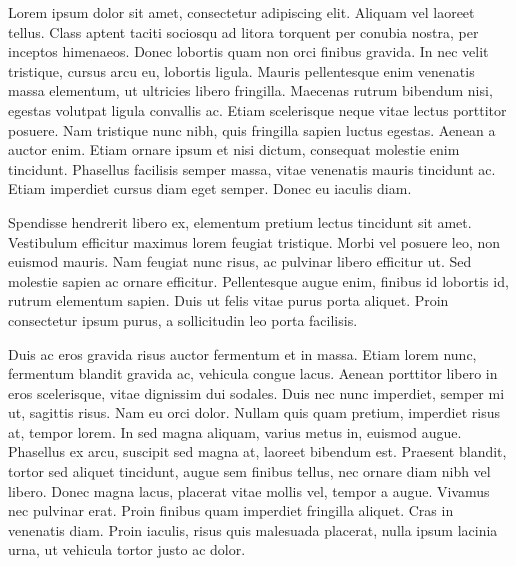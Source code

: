 \documentclass[]{ICCQS}%
\begin{document}
\begin{fmtext}
Lorem ipsum dolor sit amet, consectetur adipiscing elit. Aliquam vel laoreet tellus. Class aptent taciti sociosqu ad litora torquent per conubia nostra, per inceptos himenaeos. Donec lobortis quam non orci finibus gravida. In nec velit tristique, cursus arcu eu, lobortis ligula. Mauris pellentesque enim venenatis massa elementum, ut ultricies libero fringilla. Maecenas rutrum bibendum nisi, egestas volutpat ligula convallis ac. Etiam scelerisque neque vitae lectus porttitor posuere. Nam tristique nunc nibh, quis fringilla sapien luctus egestas. Aenean a auctor enim. Etiam ornare ipsum et nisi dictum, consequat molestie enim tincidunt. Phasellus facilisis semper massa, vitae venenatis mauris tincidunt ac. Etiam imperdiet cursus diam eget semper. Donec eu iaculis diam.

Spendisse hendrerit libero ex, elementum pretium lectus tincidunt sit amet. Vestibulum efficitur maximus lorem feugiat tristique. Morbi vel posuere leo, non euismod mauris. Nam feugiat nunc risus, ac pulvinar libero efficitur ut. Sed molestie sapien ac ornare efficitur. Pellentesque augue enim, finibus id lobortis id, rutrum elementum sapien. Duis ut felis vitae purus porta aliquet. Proin consectetur ipsum purus, a sollicitudin leo porta facilisis.

Duis ac eros gravida risus auctor fermentum et in massa. Etiam lorem nunc, fermentum blandit gravida ac, vehicula congue lacus. Aenean porttitor libero in eros scelerisque, vitae dignissim dui sodales. Duis nec nunc imperdiet, semper mi ut, sagittis risus. Nam eu orci dolor. Nullam quis quam pretium, imperdiet risus at, tempor lorem. In sed magna aliquam, varius metus in, euismod augue. Phasellus ex arcu, suscipit sed magna at, laoreet bibendum est. Praesent blandit, tortor sed aliquet tincidunt, augue sem finibus tellus, nec ornare diam nibh vel libero. Donec magna lacus, placerat vitae mollis vel, tempor a augue. Vivamus nec pulvinar erat. Proin finibus quam imperdiet fringilla aliquet. Cras in venenatis diam. Proin iaculis, risus quis malesuada placerat, nulla ipsum lacinia urna, ut vehicula tortor justo ac dolor.



\end{fmtext}


\maketitle
\end{document}
